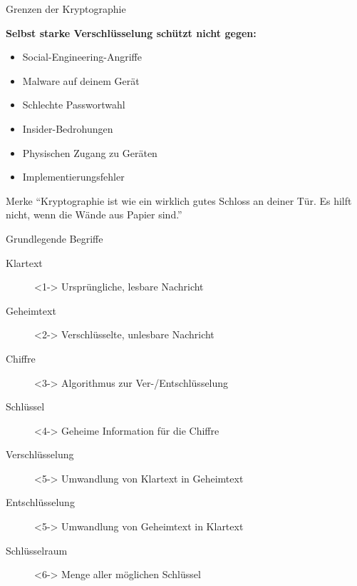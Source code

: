 \documentclass[handout]{beamer}
\begin{document}
\begin{frame}{Grenzen der Kryptographie}



\textbf{Selbst starke Verschlüsselung schützt nicht gegen:}
\begin{itemize}
    \item Social-Engineering-Angriffe
    \item Malware auf deinem Gerät
    \item Schlechte Passwortwahl
    \item Insider-Bedrohungen
    \item Physischen Zugang zu Geräten
    \item Implementierungsfehler
\end{itemize}\pause

\begin{alertblock}{Merke}
``Kryptographie ist wie ein wirklich gutes Schloss an deiner Tür. Es hilft nicht, wenn die Wände aus Papier sind.''
\end{alertblock}
\end{frame}

\begin{frame}{Grundlegende Begriffe}
\begin{description}
    \item[Klartext]<1-> Ursprüngliche, lesbare Nachricht
    \item[Geheimtext]<2-> Verschlüsselte, unlesbare Nachricht
    \item[Chiffre]<3-> Algorithmus zur Ver-/Entschlüsselung
    \item[Schlüssel]<4-> Geheime Information für die Chiffre
    \item[Verschlüsselung]<5-> Umwandlung von Klartext in Geheimtext
    \item[Entschlüsselung]<5-> Umwandlung von Geheimtext in Klartext
    \item[Schlüsselraum]<6-> Menge aller möglichen Schlüssel
\end{description}

\end{frame}


\end{document}
